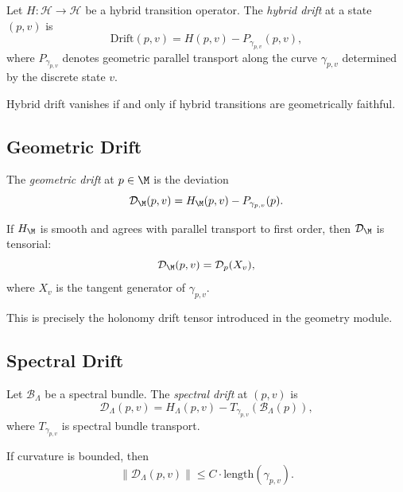 \begin{definition}
Let $H : \mathcal{H} \to \mathcal{H}$ be a hybrid transition operator.
The \emph{hybrid drift} at a state $(p,v)$ is
\[
\mathrm{Drift}(p,v)
= H(p,v) - P_{\gamma_{p,v}}(p,v),
\]
where $P_{\gamma_{p,v}}$ denotes geometric parallel transport along the
curve $\gamma_{p,v}$ determined by the discrete state $v$.
\end{definition}

\begin{lemma}
Hybrid drift vanishes if and only if hybrid transitions are geometrically
faithful.
\end{lemma}

\subsection{Geometric Drift}

\begin{definition}
The \emph{geometric drift} at $p \in \M$ is the deviation
\[
\mathcal{D}_\M(p,v)
= H_\M(p,v) - P_{\gamma_{p,v}}(p).
\]
\end{definition}

\begin{lemma}
If $H_\M$ is smooth and agrees with parallel transport to first order,
then $\mathcal{D}_\M$ is tensorial:
\[
\mathcal{D}_\M(p,v) = \mathcal{D}_p(X_v),
\]
where $X_v$ is the tangent generator of $\gamma_{p,v}$.
\end{lemma}

\begin{remark}
This is precisely the holonomy drift tensor introduced in the geometry
module.
\end{remark}

\subsection{Spectral Drift}

\begin{definition}
Let $\mathcal{B}_\Lambda$ be a spectral bundle.  
The \emph{spectral drift} at $(p,v)$ is
\[
\mathcal{D}_\Lambda(p,v)
= H_\Lambda(p,v) - T_{\gamma_{p,v}}(\mathcal{B}_\Lambda(p)),
\]
where $T_{\gamma_{p,v}}$ is spectral bundle transport.
\end{definition}

\begin{lemma}
If curvature is bounded, then
\[
\|\mathcal{D}_\Lambda(p,v)\|
\le C \cdot \mathrm{length}(\gamma_{p,v}).
\]
\end{lemma}

